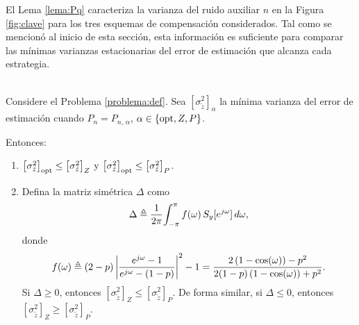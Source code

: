 El Lema \ref{lema:Pq} caracteriza la varianza del ruido auxiliar $n$ en la Figura \ref{fig:clave} para los tres esquemas de compensaci\'on considerados. Tal como se mencion\'o al inicio de esta secci\'on, esta informaci\'on es suficiente para comparar las m\'inimas varianzas estacionarias del error de estimaci\'on que alcanza cada estrategia.
\begin{coro}\label{coro:compara}{\ \\}
Considere el Problema \ref{problema:def}. Sea $\left[\sigma_{\tilde{z}}^2\right]_{\alpha}$ la m\'inima varianza del error de estimaci\'on cuando $P_n=P_{n, \, \alpha}$, $\alpha\in\{\operatorname{opt},Z,P\}$.

Entonces:
\begin{enumerate}
\item $\left[ \sigma_{\tilde{z}}^2\right]_{\operatorname{opt}} \leq \left[ \sigma_{\tilde{z}}^2 \right]_{Z}$ y $\left[\sigma_{\tilde{z}}^2 \right]_{\operatorname{opt}} \leq \left[\sigma_{\tilde{z}}^2 \right]_{P}$.
\item Defina la matriz sim\'etrica $\Delta$ como
\begin{align}\label{eq:definicion-delta}
\Delta \triangleq \frac{1}{2\pi}\!\int_{-\pi}^{\pi}  f(\omega) \, S_y[e^{j\omega}] \,  d\omega,
\end{align}
donde
\begin{align}\label{eq:definicion-f}
f(\omega) \triangleq (2-p) \left\vert  \frac{ e^{j\omega} - 1 }{ e^{j\omega} - (1-p) }  \right\vert^2 - 1 = \frac{2 \left( 1-\cos(\omega) \right) - p^2 }{ 2(1-p) \left( 1-\cos(\omega) \right) + p^2}.
\end{align}
Si $\Delta \geq 0$, entonces $\left[ \sigma_{\tilde{z}}^2 \right]_{Z}
\leq \left[ \sigma_{\tilde{z}}^2 \right]_{P}$. De forma similar, si $\Delta \leq 0$, entonces $\left[ \sigma_{\tilde{z}}^2 \right]_{Z}
\geq \left[ \sigma_{\tilde{z}}^2 \right]_{P}$.
\end{enumerate}
\end{coro}

